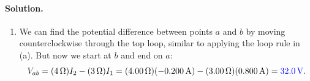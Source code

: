 \documentclass[11pt]{article}
\newcommand{\beq}{\begin{equation*}}
\newcommand{\eeq}{\end{equation*}}
\newenvironment{solution}
{
    \paragraph{Solution.}
    \ignorespaces
}
{
    \bigskip
}
\begin{document}
\begin{solution}
\begin{enumerate}
\begin{align*}
\begin{bmatrix}[c c c | c]
				1 & 1 & 1 & 0
			\end{bmatrix}
			\sim
			\begin{bmatrix}[c c c | c]
				1 & 0 & -2 & 2 \\
				0 & 1 & -2 & 1 \\
				0 & 2 & 1 & -1
			\end{bmatrix}
			\sim
			\begin{bmatrix}[c c c | c]
				1 & 0 & -2 & 2 \\
				0 & 1 & -2 & 1 \\
				0 & 0 & 5 & -3
			\end{bmatrix}
			\sim
			\begin{bmatrix}[c c c | c]
				1 & 0 & -2 & 2 \\
				0 & 1 & -2 & 1 \\
				0 & 0 & 1 & -3/5
			\end{bmatrix} \\
			&\sim
			\begin{bmatrix}[c c c | c]
				1 & 0 & 0 & 4/5 \\
				0 & 1 & 0 & -1/5 \\
				0 & 0 & 1 & -3/5
			\end{bmatrix}.
		\end{align*}
		So we have {\color{blue}
		\begin{align*}
			\Iq &= \Samp{0.800} \text{ (to the left)}, &
			\Iw &= -\Samp{0.200} \text{ (to the right)}, &
			\Ie &= -\Samp{0.600} \text{ (to the right)}.
		\end{align*}}
		
		\item We can find the potential difference between points $a$ and $b$ by moving counterclockwise through the top loop, similar to applying the loop rule in (a).  But now we start at $b$ and end on $a$:
		\beq
			\Vab = (\Sohm{4}) \Iw - (\Sohm{3}) \Iq
			= (\Sohm{4.00}) (-\Samp{0.200}) - (\Sohm{3.00}) (\Samp{0.800})
			= {\color{blue} \Svolt{32.0}}.
		\eeq
	\end{enumerate}
\end{solution}



\clearpage
\end{document}
